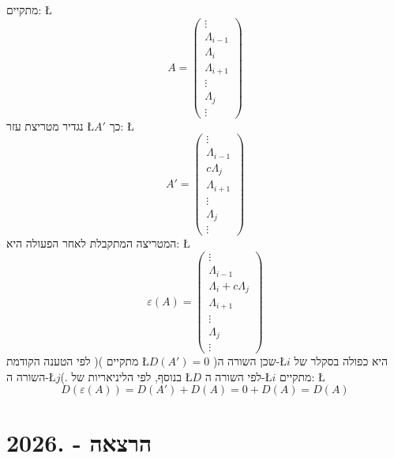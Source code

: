 \documentclass[english,hebrew]{article}
\begin{document}
מתקיים: \L{%
\[
A=\begin{pmatrix}\vdots\\
\Lambda_{i-1}\\
\Lambda_{i}\\
\Lambda_{i+1}\\
\vdots\\
\Lambda_{j}\\
\vdots
\end{pmatrix}
\]
}%
נגדיר מטריצת עזר \L{$A'$} כך: \L{%
\[
A'=\begin{pmatrix}\vdots\\
\Lambda_{i-1}\\
c\Lambda_{j}\\
\Lambda_{i+1}\\
\vdots\\
\Lambda_{j}\\
\vdots
\end{pmatrix}
\]
}%
המטריצה המתקבלת לאחר הפעולה היא: \L{%
\[
\varepsilon(A)=\begin{pmatrix}\vdots\\
\Lambda_{i-1}\\
\Lambda_{i}+c\Lambda_{j}\\
\Lambda_{i+1}\\
\vdots\\
\Lambda_{j}\\
\vdots
\end{pmatrix}
\]
}%
לפי הטענה הקודמת ){\endL}( מתקיים \L{$D(A')=0$} )שכן השורה
ה-\L{$i$} היא כפולה בסקלר של השורה ה-\L{$j$}(. בנוסף, לפי הליניאריות
של \L{$D$} לפי השורה ה-\L{$i$} מתקיים: \L{%
\[
D(\varepsilon(A))=D(A')+D(A)=0+D(A)=D(A)
\]
}%

\newpage{}

\noindent{}

\part{הרצאה {\endL} - {.2026\endL}}
\end{document}
